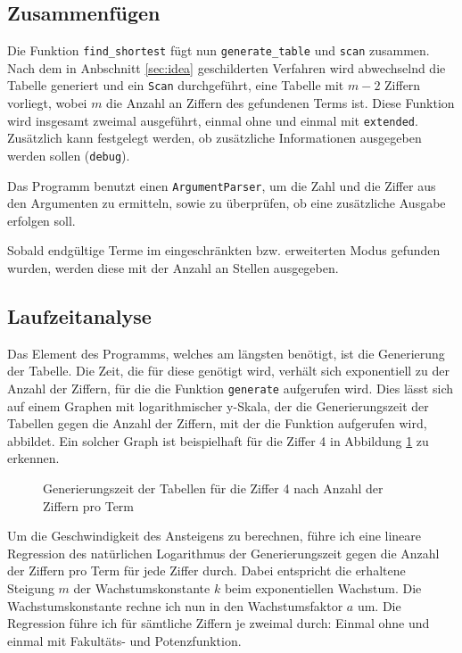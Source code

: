 \documentclass[a4paper,10pt,ngerman]{scrartcl}
\begin{document}
\subsection{Zusammenfügen}
Die Funktion \texttt{find\_shortest} fügt nun \texttt{generate\_table} und \texttt{scan} zusammen.
Nach dem in Anbschnitt \ref{sec:idea} geschilderten Verfahren wird abwechselnd die Tabelle generiert und ein \texttt{Scan} durchgeführt, eine Tabelle mit $m-2$ Ziffern vorliegt, wobei $m$ die Anzahl an Ziffern des gefundenen Terms ist.
Diese Funktion wird insgesamt zweimal ausgeführt, einmal ohne und einmal mit \texttt{extended}.
Zusätzlich kann festgelegt werden, ob zusätzliche Informationen ausgegeben werden sollen (\texttt{debug}).

Das Programm benutzt einen \texttt{ArgumentParser}, um die Zahl und die Ziffer aus den Argumenten zu ermitteln, sowie zu überprüfen, ob eine zusätzliche Ausgabe erfolgen soll.

Sobald endgültige Terme im eingeschränkten bzw. erweiterten Modus gefunden wurden, werden diese mit der Anzahl an Stellen ausgegeben.

\subsection{Laufzeitanalyse}
Das Element des Programms, welches am längsten benötigt, ist die Generierung der Tabelle.
Die Zeit, die für diese genötigt wird, verhält sich exponentiell zu der Anzahl der Ziffern, für die die Funktion \texttt{generate} aufgerufen wird.
Dies lässt sich auf einem Graphen mit logarithmischer y-Skala, der die Generierungszeit der Tabellen gegen die Anzahl der Ziffern, mit der die Funktion aufgerufen wird, abbildet.
Ein solcher Graph ist beispielhaft für die Ziffer 4 in Abbildung \ref{fig:implementation:runtime:1} zu erkennen.

\begin{figure}
  \centering
  
  \caption{Generierungszeit der Tabellen für die Ziffer 4 nach Anzahl der Ziffern pro Term}
  \label{fig:implementation:runtime:1}
\end{figure}

Um die Geschwindigkeit des Ansteigens zu berechnen, führe ich eine lineare Regression des natürlichen Logarithmus der Generierungszeit gegen die Anzahl der Ziffern pro Term für jede Ziffer durch.
Dabei entspricht die erhaltene Steigung $m$ der Wachstumskonstante $k$ beim exponentiellen Wachstum.
Die Wachstumskonstante rechne ich nun in den Wachstumsfaktor $a$ um.
Die Regression führe ich für sämtliche Ziffern je zweimal durch: Einmal ohne und einmal mit Fakultäts- und Potenzfunktion.
\end{document}
